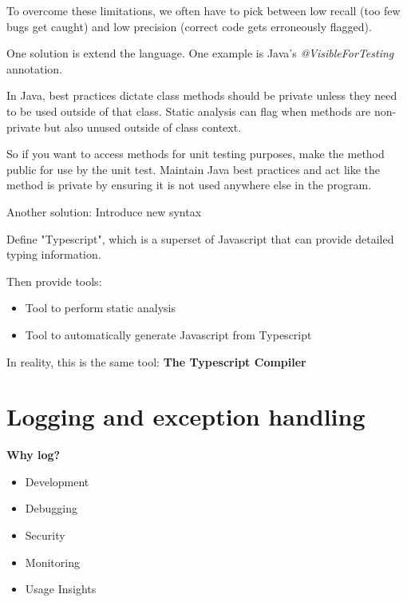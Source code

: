 \documentclass{article}
\begin{document}
To overcome these limitations, we often have to pick between low recall (too few bugs get caught) and low precision (correct code gets erroneously flagged).

\vspace*{1em}

\hrulefill

One solution is extend the language. One example is Java's \textit{@VisibleForTesting} annotation. 

\vspace*{0.5em}

In Java, best practices dictate class methods should be private unless they need to be used outside of that class. Static analysis can flag when methods are non-private but also unused outside of class context. 

\vspace*{0.5em}

So if you want to access methods for unit testing purposes, make the method public for use by the unit test. Maintain Java best practices and act like the method is private by ensuring it is not used anywhere else in the program.

\hrulefill

Another solution: Introduce new syntax 

\vspace*{.5em}

Define "Typescript", which is a superset of Javascript that can provide detailed typing information.

\vspace*{.5em}

Then provide tools:
\begin{itemize}
    \item Tool to perform static analysis 
    \item Tool to automatically generate Javascript from Typescript 
\end{itemize}

In reality, this is the same tool: \textbf{The Typescript Compiler}

\pagebreak

\section{Logging and exception handling}

\textbf{Why log? }
\begin{itemize}
    \item Development
    \item Debugging
    \item Security
    \item Monitoring 
    \item Usage Insights
\end{itemize}
\end{document}
